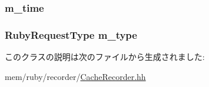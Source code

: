 \label{classTraceRecord_af4c389aff33304e09db4ca9fe19764de}
\hypertarget{classTraceRecord_abb07798437a26cd76aa37779b69dcfd3}{
\subsubsection[{m\_\-time}]{ {\bf m\_\-time}}}
\label{classTraceRecord_abb07798437a26cd76aa37779b69dcfd3}
\hypertarget{classTraceRecord_a7d010f0854d320898448eae2da5997f8}{
\subsubsection[{m\_\-type}]{\setlength{\rightskip}{0pt plus 5cm}RubyRequestType {\bf m\_\-type}}}
\label{classTraceRecord_a7d010f0854d320898448eae2da5997f8}


このクラスの説明は次のファイルから生成されました:\begin{DoxyCompactItemize}
\item 
mem/ruby/recorder/\hyperlink{CacheRecorder_8hh}{CacheRecorder.hh}\end{DoxyCompactItemize}
